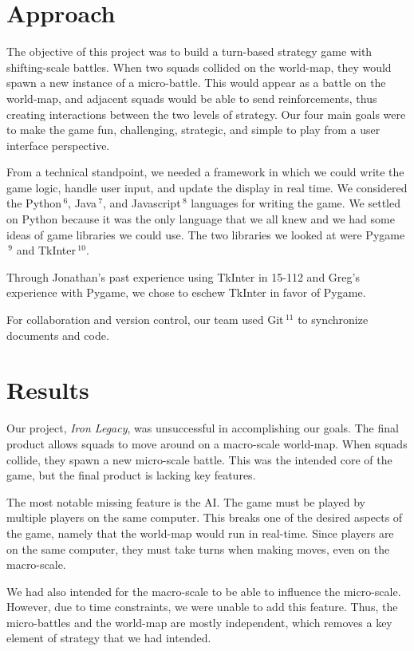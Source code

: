\documentclass{article}
\begin{document}
\section*{Approach}
The objective of this project was to build a turn-based strategy game with 
shifting-scale battles.
When two squads collided on the world-map, they would spawn a new instance of
a micro-battle.
This would appear as a battle on the world-map, and adjacent squads would be
able to send reinforcements, thus creating interactions between the two
levels of strategy.
Our four main goals were to make the game fun, challenging, strategic, and 
simple to play from a user interface perspective.

From a technical standpoint, we needed a framework in which we could write the
game logic, handle user input, and update the display in real time.
We considered the Python$\,^6$, Java$\,^7$, and 
Javascript$\,^8$ languages for writing the game. 
We settled on Python because it was the only language that we all knew
and we had some ideas of game libraries we could use.
The two libraries we looked at were Pygame$\,^9$ and TkInter$\,^{10}$.

Through Jonathan's past experience using TkInter in 15-112 and Greg's 
experience with Pygame, we chose to eschew TkInter in favor of Pygame.

For collaboration and version control, our team used Git$\,^{11}$ to
synchronize documents and code.

\section*{Results}

Our project, \emph{Iron Legacy}, was unsuccessful in accomplishing
    our goals.
    The final product allows squads to move around on a macro-scale world-map.
    When squads collide, they spawn a new micro-scale battle.
    This was the intended core of the game, but the final product is lacking
    key features.

The most notable missing feature is the AI.
    The game must be played by multiple players on the same computer.
    This breaks one of the desired aspects of the game,
    namely that the world-map would run in real-time.
    Since players are on the same computer, they must take turns when making
    moves, even on the macro-scale.

We had also intended for the macro-scale to be able to influence the
    micro-scale.
    However, due to time constraints, we were unable to add this feature.
    Thus, the micro-battles and the world-map are mostly independent,
    which removes a key element of strategy that we had intended.
\end{document}

